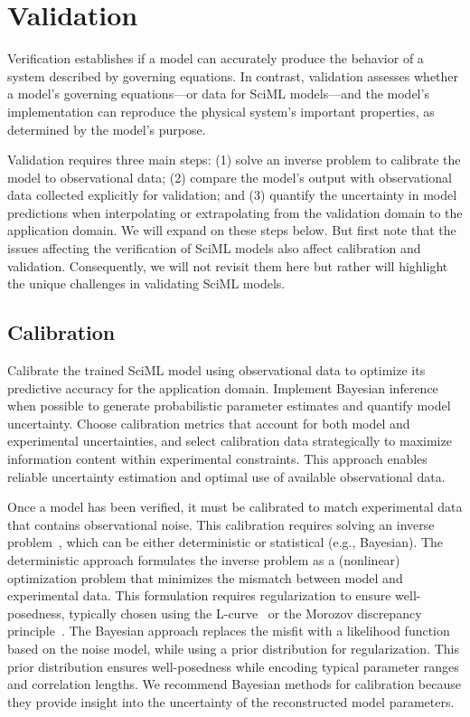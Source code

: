 \section{Validation}
\label{sec:validation}

Verification establishes if a model can accurately produce the behavior of a system described by governing equations. In contrast, validation assesses whether a \CSE{} model's governing equations---or data for SciML models---and the model's implementation can reproduce the physical system's important properties, as determined by the model's purpose.

Validation requires three main steps: (1) solve an inverse problem to calibrate the model to observational data; (2) compare the model's output with observational data collected explicitly for validation; and (3) quantify the uncertainty in model predictions when interpolating or extrapolating from the validation domain to the application domain. We will expand on these steps below.
But first note that the issues affecting the verification of SciML models also affect calibration and validation. Consequently, we will not revisit them here but rather will highlight the unique challenges in validating SciML models.

\subsection{Calibration}

\begin{essrec}
Calibrate the trained SciML model using observational data to optimize its predictive accuracy for the application domain. Implement Bayesian inference when possible to generate probabilistic parameter estimates and quantify model uncertainty. Choose calibration metrics that account for both model and experimental uncertainties, and select calibration data strategically to maximize information content within experimental constraints. This approach enables reliable uncertainty estimation and optimal use of available observational data.
\end{essrec}

Once a \CSE{} model has been verified, it must be calibrated to match experimental data that contains observational noise. This calibration requires solving an inverse problem~\cite{Stuart_AN_2010}, which can be either deterministic or statistical (e.g., Bayesian). The deterministic approach formulates the inverse problem as a (nonlinear) optimization problem that minimizes the mismatch between model and experimental data. This formulation requires regularization to ensure well-posedness, typically chosen using the L-curve~\cite{hansen1999curve} or the Morozov discrepancy principle~\cite{anzengruber2009morozov}. The Bayesian approach replaces the misfit with a likelihood function based on the noise model, while using a prior distribution for regularization. This prior distribution ensures well-posedness while encoding typical parameter ranges and correlation lengths. We recommend Bayesian methods for calibration because they provide insight into the uncertainty of the reconstructed model parameters. 

